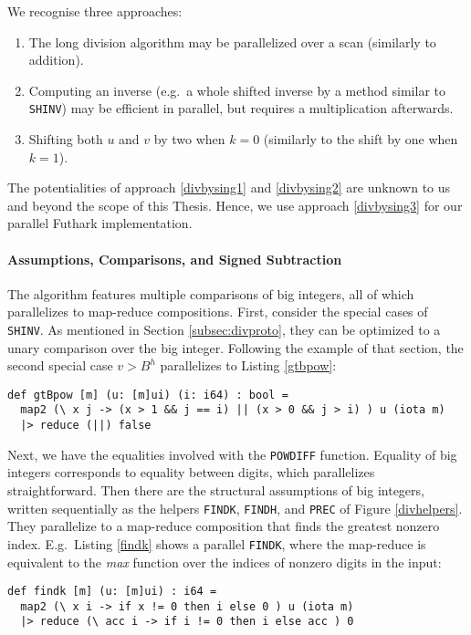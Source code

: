 We recognise three approaches:
\begin{enumerate}
\item The long division algorithm may be parallelized over a scan (similarly to
  addition).\label{divbysing1}
\item Computing an inverse (e.g.\ a whole shifted inverse by a method similar to
  \texttt{SHINV}) may be efficient in parallel, but requires a multiplication
  afterwards.\label{divbysing2}
\item Shifting both $u$ and $v$ by two when $k = 0$ (similarly to the shift by
  one when $k=1$).\label{divbysing3}
\end{enumerate}

The potentialities of approach \ref{divbysing1} and \ref{divbysing2} are unknown
to us and beyond the scope of this Thesis. Hence, we use approach
\ref{divbysing3} for our parallel Futhark implementation.

\paragraph{Assumptions, Comparisons, and Signed Subtraction}
The algorithm features multiple comparisons of big integers, all of which
parallelizes to map-reduce compositions. First, consider the special cases of
\texttt{SHINV}. As mentioned in Section \ref{subsec:divproto}, they can be
optimized to a unary comparison over the big integer. Following the example of
that section, the second special case $v > B^h$ parallelizes to Listing
\ref{gtbpow}:
\begin{lstlisting}[language=futhark,caption={\footnotesize Futhark function to check $u > B^i$ in parallel for some big int $u$ in base $B$ from file \texttt{div.fut}.},label={gtbpow},firstnumber=29]
def gtBpow [m] (u: [m]ui) (i: i64) : bool =
  map2 (\ x j -> (x > 1 && j == i) || (x > 0 && j > i) ) u (iota m)
  |> reduce (||) false
\end{lstlisting}
Next, we have the equalities involved with the \texttt{POWDIFF}
function. Equality of big integers corresponds to equality between digits, which
parallelizes straightforward. Then there are the structural assumptions of big
integers, written sequentially as the helpers \texttt{FINDK}, \texttt{FINDH},
and \texttt{PREC} of Figure \ref{divhelpers}. They parallelize to a map-reduce
composition that finds the greatest nonzero index. E.g.\ Listing \ref{findk}
shows a parallel \texttt{FINDK}, where the map-reduce is equivalent to the
\textit{max} function over the indices of nonzero digits in the input:
\begin{lstlisting}[language=futhark,caption={\footnotesize Futhark function to find $i$ for big integer $u$ in base $B$ s.t.\ $B^i \leq u < B^{i+1}$ from file \texttt{div.fut}.},label={findk},firstnumber=39]
def findk [m] (u: [m]ui) : i64 =
  map2 (\ x i -> if x != 0 then i else 0 ) u (iota m)
  |> reduce (\ acc i -> if i != 0 then i else acc ) 0
\end{lstlisting}

